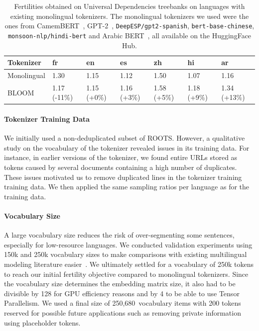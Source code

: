 \documentclass[twoside,11pt]{article}
\begin{document}
\begin{table}[ht]
\begin{center}
\begin{tabular}{lllllll}
\toprule
\textbf{Tokenizer} & \textbf{fr} & \textbf{en} & \textbf{es} & \textbf{zh} & \textbf{hi} & \textbf{ar} \\ 
\midrule
Monolingual   & 1.30 & 1.15 & 1.12 & 1.50 & 1.07 & 1.16 \\ 
BLOOM         & 1.17 {\scriptsize(-11\%)} & 1.15 {\scriptsize(+0\%)} & 1.16 {\scriptsize(+3\%)} & 1.58 {\scriptsize(+5\%)} & 1.18 {\scriptsize(+9\%)} & 1.34 {\scriptsize(+13\%)} \\ 
\bottomrule
\end{tabular}
\caption{Fertilities obtained on Universal Dependencies treebanks on languages with existing monolingual tokenizers. The monolingual tokenizers we used were the ones from CamemBERT~\citep{martin2020camembert}, GPT-2~\citep{radford2019language}, \texttt{DeepESP/gpt2-spanish}, \texttt{bert-base-chinese}, \texttt{monsoon-nlp/hindi-bert} and Arabic BERT~\citep{safaya2020kuisail}, all available on the HuggingFace Hub.}
\label{table:ud_fertilities}
\end{center}
\end{table}

\paragraph{Tokenizer Training Data} We initially used a non-deduplicated subset of ROOTS. However, a qualitative study on the vocabulary of the tokenizer revealed issues in its training data. For instance, in earlier versions of the tokenizer, we found entire URLs stored as tokens caused by several documents containing a high number of duplicates. These issues motivated us to remove duplicated lines in the tokenizer training training data. We then applied the same sampling ratios per language as for the training data.

\paragraph{Vocabulary Size} 

A large vocabulary size reduces the risk of over-segmenting some sentences, especially for low-resource languages. We conducted validation experiments using 150k and 250k vocabulary sizes to make comparisons with existing multilingual modeling literature easier~\citep{conneau2020unsupervised,xue2021mt5}. We ultimately settled for a vocabulary of 250k tokens to reach our initial fertility objective compared to monolingual tokenizers. Since the vocabulary size determines the embedding matrix size, it also had to be divisible by 128 for GPU efficiency reasons and by 4 to be able to use Tensor Parallelism. We used a final size of 250,680~vocabulary items with 200 tokens reserved for possible future applications such as removing private information using placeholder tokens.
\end{document}
